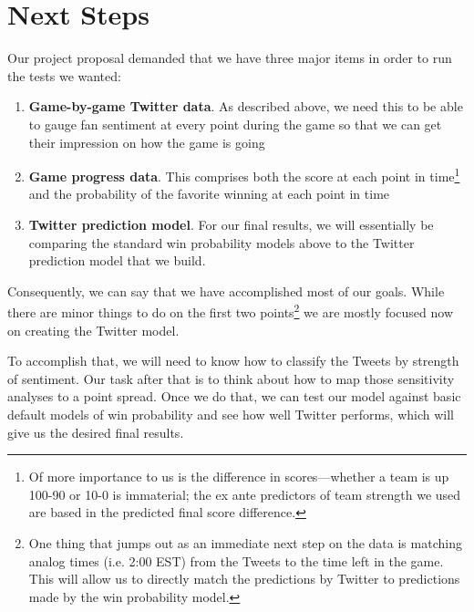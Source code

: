 \documentclass[12pt]{article}
\begin{document}
\section*{Next Steps}

Our project proposal demanded that we have three major items in order to run the tests we wanted:
\begin{enumerate}
	\item \textbf{Game-by-game Twitter data}. As described above, we need this to be able to gauge fan sentiment at every point during the game so that we can get their impression on how the game is going
	\item \textbf{Game progress data}. This comprises both the score at each point in time\footnote{Of more importance to us is the difference in scores---whether a team is up 100-90 or 10-0 is immaterial; the ex ante predictors of team strength we used are based in the predicted final score difference.} and the probability of the favorite winning at each point in time
	\item \textbf{Twitter prediction model}. For our final results, we will essentially be comparing the standard win probability models above to the Twitter prediction model that we build. 
\end{enumerate}

Consequently, we can say that we have accomplished most of our goals. While there are minor things to do on the first two points\footnote{One thing that jumps out as an immediate next step on the data is matching analog times (i.e. 2:00 EST) from the Tweets to the time left in the game. This will allow us to directly match the predictions by Twitter to predictions made by the win probability model.} we are mostly focused now on creating the Twitter model. 

To accomplish that, we will need to know how to classify the Tweets by strength of sentiment. Our task after that is to think about how to map those sensitivity analyses to a point spread. Once we do that, we can test our model against basic default models of win probability and see how well Twitter performs, which will give us the desired final results.  
\end{document}
